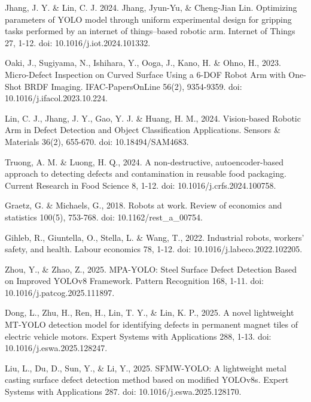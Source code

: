 
\begin{thebibliography}{9}

  Jhang, J. Y. \& Lin, C. J. 2024. Jhang, Jyun-Yu, \& Cheng-Jian
  Lin. Optimizing parameters of YOLO model through uniform
  experimental design for gripping tasks performed by an internet of
  things–based robotic arm. Internet of Things 27, 1-12. doi:
  10.1016/j.iot.2024.101332.

  Oaki, J., Sugiyama, N., Ishihara, Y., Ooga, J., Kano, H. \& Ohno,
  H., 2023. Micro-Defect Inspection on Curved Surface Using a 6-DOF
  Robot Arm with One-Shot BRDF Imaging. IFAC-PapersOnLine 56(2),
  9354-9359. doi: 10.1016/j.ifacol.2023.10.224.

  Lin, C. J., Jhang, J. Y., Gao, Y. J. \& Huang, H. M., 2024.
  Vision-based Robotic Arm in Defect Detection and Object
  Classification Applications. Sensors \& Materials 36(2), 655-670.
  doi: 10.18494/SAM4683.

  Truong, A. M. \& Luong, H. Q., 2024. A non-destructive,
  autoencoder-based approach to detecting defects and contamination
  in reusable food packaging. Current Research in Food Science 8, 1-12.
  doi: 10.1016/j.crfs.2024.100758.

  Graetz, G. \& Michaels, G., 2018. Robots at work. Review of
  economics and statistics 100(5), 753-768. doi: 10.1162/rest\_a\_00754.

  Gihleb, R., Giuntella, O., Stella, L. \& Wang, T., 2022.
  Industrial robots, workers’ safety, and health. Labour economics
  78, 1-12. doi: 10.1016/j.labeco.2022.102205.

  Zhou, Y., \& Zhao, Z., 2025. MPA-YOLO: Steel Surface Defect
  Detection Based on Improved YOLOv8 Framework. Pattern Recognition
  168, 1-11. doi: 10.1016/j.patcog.2025.111897.

  Dong, L., Zhu, H., Ren, H., Lin, T. Y., \& Lin, K. P., 2025. A
  novel lightweight MT-YOLO detection model for identifying defects
  in permanent magnet tiles of electric vehicle motors. Expert
  Systems with Applications 288, 1-13. doi: 10.1016/j.eswa.2025.128247.

  Liu, L., Du, D., Sun, Y., \& Li, Y., 2025. SFMW-YOLO: A lightweight
  metal casting surface defect detection method based on modified
  YOLOv8s. Expert Systems with Applications 287. doi:
  10.1016/j.eswa.2025.128170.


\end{thebibliography}
